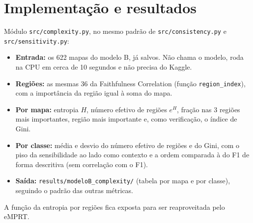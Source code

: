 \documentclass[11pt,a4paper]{article}
\begin{document}
\section{Implementação e resultados}\label{sec:impl}
Módulo \texttt{src/complexity.py}, no mesmo padrão de \texttt{src/consistency.py} e \texttt{src/sensitivity.py}:
\begin{itemize}
\item \textbf{Entrada:} os 622 mapas do modelo B, já salvos. Não chama o modelo, roda na CPU em cerca de 10 segundos e não precisa do Kaggle.
\item \textbf{Regiões:} as mesmas 36 da Faithfulness Correlation (função \texttt{region\_index}), com a importância da região igual à soma do mapa.
\item \textbf{Por mapa:} entropia $H$, número efetivo de regiões $e^{H}$, fração nas 3 regiões mais importantes, região mais importante e, como verificação, o índice de Gini.
\item \textbf{Por classe:} média e desvio do número efetivo de regiões e do Gini, com o piso da sensibilidade ao lado como contexto e a ordem comparada à do F1 de forma descritiva (sem correlação com o F1).
\item \textbf{Saída:} \texttt{results/modeloB\_complexity/} (tabela por mapa e por classe), seguindo o padrão das outras métricas.
\end{itemize}
A função da entropia por regiões fica exposta para ser reaproveitada pelo eMPRT.
\end{document}
